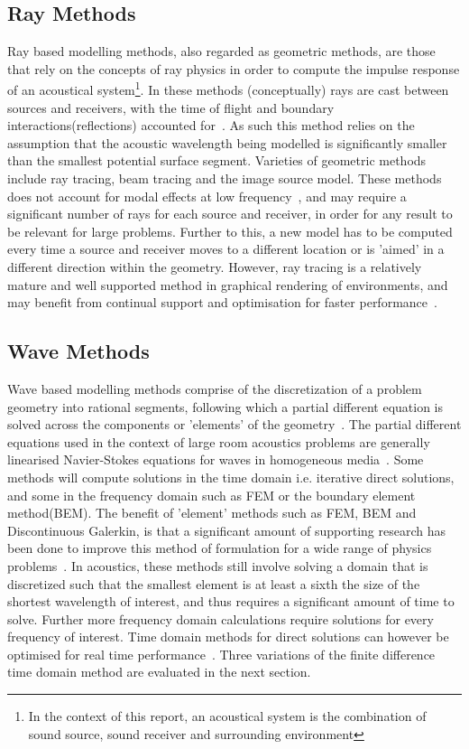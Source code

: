 \documentclass{svproc}
\begin{document}
\subsection{Ray Methods}

Ray based modelling methods, also regarded as geometric methods, are those that rely on the concepts of ray physics in order to compute the impulse response of an acoustical system\footnote{In the context of this report, an acoustical system is the combination of sound source, sound receiver and surrounding environment}. In these methods (conceptually) rays are cast between sources and receivers, with the time of flight and boundary interactions(reflections) accounted for~\cite{Elorza2005}. As such this method relies on the assumption that the acoustic wavelength being modelled is significantly smaller than the smallest potential surface segment. Varieties of geometric methods include ray tracing, beam tracing and the image source model. These methods does not account for modal effects at low frequency~\cite{Rober2007}, and may require a significant number of rays for each source and receiver, in order for any result to be relevant for large problems. Further to this, a new model has to be computed every time a source and receiver moves to a different location or is 'aimed' in a different direction within the geometry. However, ray tracing is a relatively mature and well supported method in graphical rendering of environments, and may benefit from continual support and optimisation for faster performance~\cite{Rober2007}.


\subsection{Wave Methods}

Wave based modelling methods comprise of the discretization of a problem geometry into rational segments, following which a partial different equation is solved across the components or 'elements' of the geometry~\cite{Bilbao2004}. The partial different equations used in the context of large room acoustics problems are generally linearised Navier-Stokes equations for waves in homogeneous media~\cite{Rienstra1952a}. Some methods will compute solutions in the time domain i.e. iterative direct solutions, and some in the frequency domain such as FEM or the boundary element method(BEM). The benefit of 'element' methods such as FEM, BEM and Discontinuous Galerkin, is that a significant amount of supporting research has been done to improve this method of formulation for a wide range of physics problems~\cite{Zienkiewicz2013}. In acoustics, these methods still involve solving a domain that is discretized such that the smallest element is at least a sixth the size of the shortest wavelength of interest, and thus requires a significant amount of time to solve. Further more frequency domain calculations require solutions for every frequency of interest. Time domain methods for direct solutions can however be optimised for real time performance~\cite{Savioja2010}. Three variations of the finite difference time domain method are evaluated in the next section.
\newpage
\end{document}
